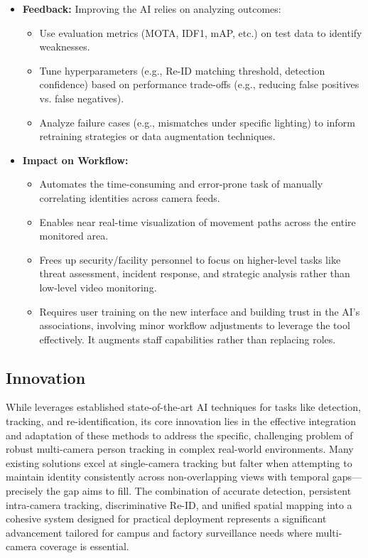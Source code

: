 \begin{itemize}
    \item \textbf{Feedback:} Improving the AI relies on analyzing outcomes:
        \begin{itemize}
            \item Use evaluation metrics (MOTA, IDF1, mAP, etc.) on test data to identify weaknesses.
            \item Tune hyperparameters (e.g., Re-ID matching threshold, detection confidence) based on performance trade-offs (e.g., reducing false positives vs. false negatives).
            \item Analyze failure cases (e.g., mismatches under specific lighting) to inform retraining strategies or data augmentation techniques.
        \end{itemize}

    \item \textbf{Impact on Workflow:}
        \begin{itemize}
            \item Automates the time-consuming and error-prone task of manually correlating identities across camera feeds.
            \item Enables near real-time visualization of movement paths across the entire monitored area.
            \item Frees up security/facility personnel to focus on higher-level tasks like threat assessment, incident response, and strategic analysis rather than low-level video monitoring.
            \item Requires user training on the new interface and building trust in the AI's associations, involving minor workflow adjustments to leverage the tool effectively. It augments staff capabilities rather than replacing roles.
        \end{itemize}
\end{itemize}

\subsection{Innovation}
\label{subsection:innovation} %
While \usevar{\srsTitle} leverages established state-of-the-art AI techniques for tasks like detection, tracking, and re-identification, its core innovation lies in the effective integration and adaptation of these methods to address the specific, challenging problem of robust multi-camera person tracking in complex real-world environments. Many existing solutions excel at single-camera tracking but falter when attempting to maintain identity consistently across non-overlapping views with temporal gaps—precisely the gap \usevar{\srsTitle} aims to fill. The combination of accurate detection, persistent intra-camera tracking, discriminative Re-ID, and unified spatial mapping into a cohesive system designed for practical deployment represents a significant advancement tailored for campus and factory surveillance needs where multi-camera coverage is essential.


